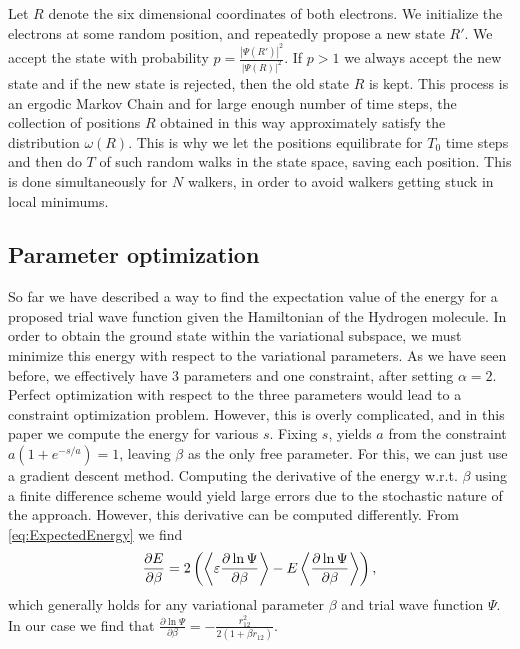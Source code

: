 \documentclass[twoside]{article}
\begin{document}
Let $R$ denote the six dimensional coordinates of both electrons. We initialize the electrons at some random position, and repeatedly propose a new state $R'$. We accept the state with probability $p = \frac{|\Psi(R')|^2}{|\Psi(R)|^2}$. If $p > 1$ we always accept the new state and if the new state is rejected, then the old state $R$ is kept. 
This process is an ergodic Markov Chain and for large enough number of time steps, the collection of positions $R$ obtained in this way approximately satisfy the distribution $\omega(R)$. This is why we let the positions equilibrate for $T_0$ time steps and then do $T$ of such random walks in the state space, saving each position. This is done simultaneously for $N$ walkers, in order to avoid walkers getting stuck in local minimums.

\subsection{Parameter optimization}\label{sec:paramaterOptimization}
So far we have described a way to find the expectation value of the energy for a proposed trial wave function given the Hamiltonian of the Hydrogen molecule. In order to obtain the ground state within the variational subspace, we must minimize this energy with respect to the variational parameters. As we have seen before, we effectively have 3 parameters and one constraint, after setting $\alpha = 2$. Perfect optimization with respect to the three parameters would lead to a constraint optimization problem. However, this is overly complicated, and in this paper we compute the energy for various $s$. Fixing $s$, yields $a$ from the constraint $a(1+e^{-s/a}) = 1$, leaving $\beta$ as the only free parameter. For this, we can just use a gradient descent method. Computing the derivative of the energy w.r.t. $\beta$ using a finite difference scheme would yield large errors due to the stochastic nature of the approach. However, this derivative can be computed differently. From \eqref{eq:ExpectedEnergy} we find\cite{ref_Harju}\cite{ref_Thijssen} 
\begin{equation}
\frac{\partial E}{\partial \beta} = 2\left( \Braket{\varepsilon \frac{\partial \ln \Psi}{\partial \beta}} - E\Braket{\frac{\partial \ln \Psi}{\partial \beta}} \right),
\end{equation}
which generally holds for any variational parameter $\beta$ and trial wave function $\Psi$. In our case we find that $\frac{\partial \ln \Psi}{\partial \beta} = -\frac{r_{12}^2}{2(1+\beta r_{12})}$.
\end{document}
